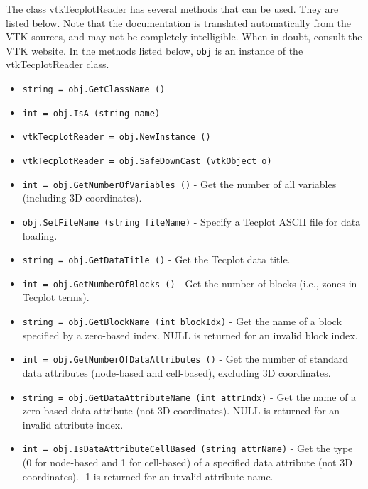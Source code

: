 The class vtkTecplotReader has several methods that can be used.
  They are listed below.
Note that the documentation is translated automatically from the VTK sources,
and may not be completely intelligible.  When in doubt, consult the VTK website.
In the methods listed below, \verb|obj| is an instance of the vtkTecplotReader class.
\begin{itemize}
\item  \verb|string = obj.GetClassName ()|

\item  \verb|int = obj.IsA (string name)|

\item  \verb|vtkTecplotReader = obj.NewInstance ()|

\item  \verb|vtkTecplotReader = obj.SafeDownCast (vtkObject o)|

\item  \verb|int = obj.GetNumberOfVariables ()| -  Get the number of all variables (including 3D coordinates).

\item  \verb|obj.SetFileName (string fileName)| -  Specify a Tecplot ASCII file for data loading.

\item  \verb|string = obj.GetDataTitle ()| -  Get the Tecplot data title.

\item  \verb|int = obj.GetNumberOfBlocks ()| -  Get the number of blocks (i.e., zones in Tecplot terms).

\item  \verb|string = obj.GetBlockName (int blockIdx)| -  Get the name of a block specified by a zero-based index. NULL is returned
 for an invalid block index.

\item  \verb|int = obj.GetNumberOfDataAttributes ()| -  Get the number of standard data attributes (node-based and cell-based),
 excluding 3D coordinates.

\item  \verb|string = obj.GetDataAttributeName (int attrIndx)| -  Get the name of a zero-based data attribute (not 3D coordinates). NULL is
 returned for an invalid attribute index.

\item  \verb|int = obj.IsDataAttributeCellBased (string attrName)| -  Get the type (0 for node-based and 1 for cell-based) of a specified data 
 attribute (not 3D coordinates). -1 is returned for an invalid attribute 
 name.


\end{itemize}
